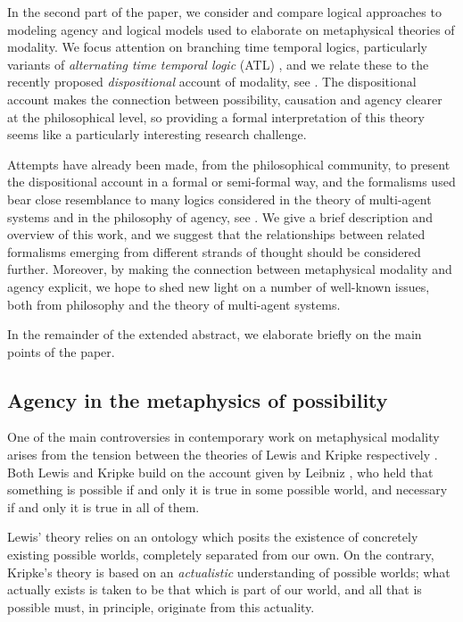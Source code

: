 \documentclass{article}
\begin{document}
In the second part of the paper, we consider and compare logical approaches to modeling agency and logical models used to elaborate on metaphysical theories of modality. We focus attention on branching time temporal logics, particularly variants of \emph{alternating time temporal logic} (ATL) \cite{atl}, and we relate these to the recently proposed \emph{dispositional} account of modality, see \cite{dispmod,MwPw}. The dispositional account makes the connection between possibility, causation and agency clearer at the philosophical level, so providing a formal interpretation of this theory seems like a particularly interesting research challenge.

Attempts have already been made, from the philosophical community, to present the dispositional account in a formal or semi-formal way, and the formalisms used bear close resemblance to many logics considered in the theory of multi-agent systems and in the philosophy of agency, see \cite{powmod,PhDpos}. We give a brief description and overview of this work, and we suggest that the relationships between related formalisms  emerging from different strands of thought should be considered further. Moreover, by making the connection between metaphysical modality and agency explicit, we hope to shed new light on a number of well-known issues, both from philosophy and the theory of multi-agent systems.

In the remainder of the extended abstract, we elaborate briefly on the main points of the paper.

\subsection*{Agency in the metaphysics of possibility}

One of the main controversies in contemporary work on metaphysical modality arises from the tension between the theories of Lewis and Kripke respectively \cite{KripkeNN,KripkeIN,LewisPW,LewisCPB}. Both Lewis and Kripke build on the account given by Leibniz \cite{Theodicy}, who held that something is possible if and only it is true in some possible world, and necessary if and only it is true in all of them.

Lewis' theory relies on an ontology which posits the existence of concretely existing possible worlds, completely separated from our own. On the contrary, Kripke's theory is based on an \emph{actualistic} understanding of possible worlds; what actually exists is taken to be that which is part of our world, and all that is possible must, in principle, originate from this actuality.
\end{document}

